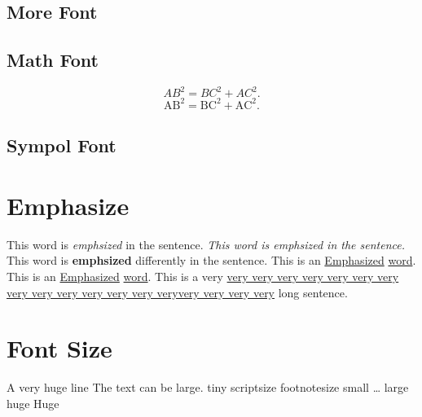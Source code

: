 \documentclass{article}
\newcommand\Emph{\textbf}
\begin{document}
        \subsection{More Font}
                
        \subsection{Math Font}
            \begin{equation}
                AB^2 = BC^2 + AC^2. 
            \end{equation}
            \begin{equation}
                \mathrm{AB^2 = BC^2 + AC^2. }
            \end{equation}

        \subsection{Sympol Font}
            {}
            
    \section{Emphasize}
        This word is \emph{emphsized} in the sentence. \newline
        \textit{This word is \emph{emphsized} in the sentence.}\newline  
        This word is \Emph{emphsized} differently in the sentence. \newline
        This is an \underline{Emphasized} \underline{word}. \newline 
        This is an \uline{Emphasized} \uline{word}. \newline
        This is a very \uline{very very very very very very very very very very 
        very very very veryvery very very very} long sentence. 

    \section{Font Size} 
        {
            \fontsize{24.88pt}{36pt} \selectfont 
            A very huge\newline
            line
        }\newline  
        The text can be {\Large large}. \newline
        {\tiny tiny}\newline
        {\scriptsize scriptsize}\newline
        {\footnotesize footnotesize}\newline
        {\small small}\newline
        \ldots\newline
        {\LARGE large}\newline
        {\huge huge}\newline
        {\Huge Huge}\newline 
\end{document}
